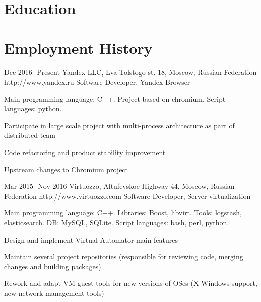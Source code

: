 \documentclass[10pt]{article} %
\begin{document}
\section{Education}



\section{Employment History}

\job
{Dec 2016 -}{Present}
{Yandex LLC, Lva Tolstogo st. 18, Moscow, Russian Federation}
{http://www.yandex.ru}
{Software Developer, Yandex Browser}
{
Main programming language: C++. Project based on chromium. Script languages: python.
\begin{itemize-noindent}
\setlength\itemsep{0em}
\item{Participate in large scale project with multi-process architecture as part of distributed team}
\item{Code refactoring and product stability improvement}
\item{Upstream changes to Chromium project}
\end{itemize-noindent}
}


\job
{Mar 2015 -}{Nov 2016}
{Virtuozzo, Altufevskoe Highway 44, Moscow, Russian Federation}
{http://www.virtuozzo.com}
{Software Developer, Server virtualization}
{
Main programming language: C++. Libraries: Boost, libvirt. Tools: logstash, elasticsearch. DB: MySQL, SQLite. Script languages: bash, perl, python.
\begin{itemize-noindent}
\setlength\itemsep{0em}
\item{Design and implement Virtual Automator main features}
\item{Maintain several project repositories (responsible for reviewing code, merging changes and building packages)}
\item{Rework and adapt VM guest tools for new versions of OSes (X Windows support, new network management tools)}
\end{itemize-noindent}
}
\end{document}
